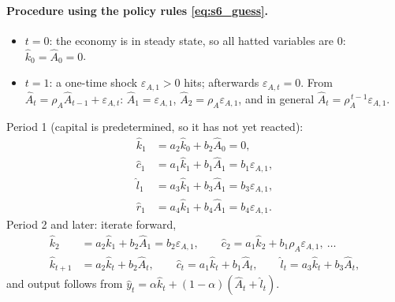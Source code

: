 \paragraph{Procedure using the policy rules \eqref{eq:s6_guess}.}
\begin{itemize}
  \item $t=0$: the economy is in steady state, so all hatted variables are $0$: $\hat k_0=\hat A_0=0$.
  \item $t=1$: a one-time shock $\varepsilon_{A,1}>0$ hits; afterwards $\varepsilon_{A,t}=0$. From $\hat A_t=\rho_A\hat A_{t-1}+\varepsilon_{A,t}$: $\hat A_1=\varepsilon_{A,1}$, $\hat A_2=\rho_A\varepsilon_{A,1}$, and in general $\hat A_t=\rho_A^{\,t-1}\varepsilon_{A,1}$.
\end{itemize}
Period 1 (capital is predetermined, so it has not yet reacted):
\begin{align*}
\hat k_1&=a_2\hat k_0+b_2\hat A_0=0,\\
\hat c_1&=a_1\hat k_1+b_1\hat A_1=b_1\varepsilon_{A,1},\\
\hat l_1&=a_3\hat k_1+b_3\hat A_1=b_3\varepsilon_{A,1},\\
\hat r_1&=a_4\hat k_1+b_4\hat A_1=b_4\varepsilon_{A,1}.
\end{align*}
Period 2 and later: iterate forward,
\begin{align*}
\hat k_2&=a_2\hat k_1+b_2\hat A_1=b_2\varepsilon_{A,1},\qquad \hat c_2=a_1\hat k_2+b_1\rho_A\varepsilon_{A,1},\ \dots\\
\hat k_{t+1}&=a_2\hat k_t+b_2\hat A_t,\qquad \hat c_t=a_1\hat k_t+b_1\hat A_t,\qquad \hat l_t=a_3\hat k_t+b_3\hat A_t,
\end{align*}
and output follows from $\hat y_t=\alpha\hat k_t+(1-\alpha)(\hat A_t+\hat l_t)$.

